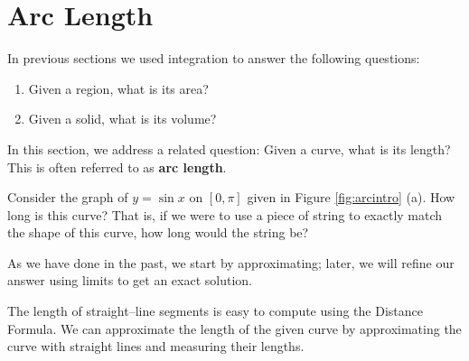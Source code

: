 \section{Arc Length}{}{}\label{sec:Arc Length}


In previous sections we used integration to answer the following questions:
	\begin{enumerate}
	\item		Given a region, what is its area?
	\item		Given a solid, what is its volume?
	\end{enumerate}
	
In this section, we address a related question: Given a curve, what is its length? This is often referred to as \textbf{arc length}. 

Consider the graph of $y=\sin x$ on $[0,\pi]$ given in Figure \ref{fig:arcintro} (a). How long is this curve? That is, if we were to use a piece of string to exactly match the shape of this curve, how long would the string be?

As we have done in the past, we start by approximating; later, we will refine our answer using limits to get an exact solution.

The length of straight--line segments is easy to compute using the Distance Formula. We can approximate the length of the given curve by approximating the curve with straight lines and measuring their lengths. 


